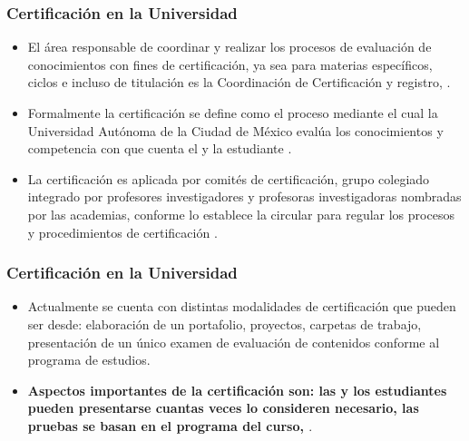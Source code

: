 \documentclass[xcolor=dvipsnames]{beamer}
\begin{document}
\begin{frame}\frametitle{Certificaci\'on en la Universidad}
\begin{itemize}

\item El \'area responsable de coordinar y realizar los procesos de evaluaci\'on de conocimientos con fines de certificaci\'on, ya sea para materias espec\'ificos, ciclos e incluso de titulaci\'on es la Coordinaci\'on de Certificaci\'on y registro, \cite{ProyectoEducativo}.




\item Formalmente la certificaci\'on se define como el proceso mediante el cual la Universidad Aut\'onoma de la Ciudad de M\'exico eval\'ua los conocimientos y competencia con que cuenta el y la estudiante \cite{CircularCertificacion}.


\item La certificaci\'on es aplicada por comit\'es de certificaci\'on, grupo colegiado integrado por profesores investigadores y profesoras investigadoras  nombradas por las academias,  conforme lo establece la circular para regular los procesos y procedimientos de certificaci\'on \cite{CircularCertificacion}.


\end{itemize}





\end{frame}


\begin{frame}\frametitle{Certificaci\'on en la Universidad}
\begin{itemize}

\item Actualmente se cuenta con distintas modalidades de certificaci\'on que pueden ser desde: elaboraci\'on de un portafolio,  proyectos, carpetas de trabajo,  presentaci\'on de un \'unico examen de evaluaci\'on de contenidos conforme al programa de estudios.



\item 
\textbf{Aspectos importantes de la certificaci\'on son: las y los estudiantes pueden presentarse cuantas veces lo consideren necesario, las pruebas se basan en el programa del curso, \cite{Doc3}}.


\end{itemize}



\end{frame}
\end{document}
